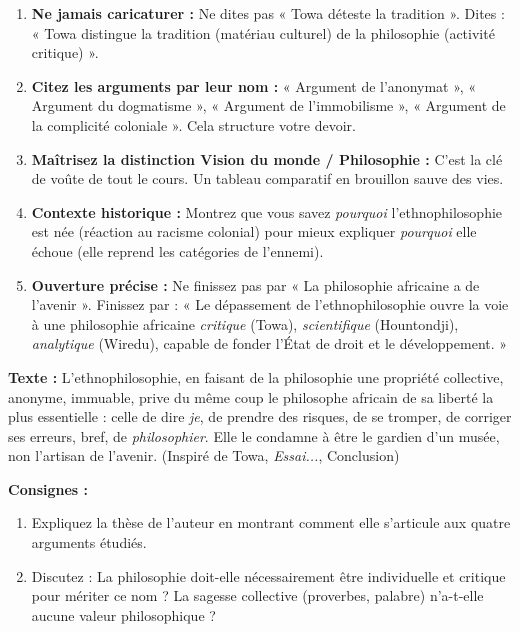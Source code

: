 \documentclass[11pt]{article}
\begin{document}
\begin{methode}
\begin{enumerate}
    \item \textbf{Ne jamais caricaturer :} Ne dites pas « Towa déteste la tradition ». Dites : « Towa distingue la tradition (matériau culturel) de la philosophie (activité critique) ».
    \item \textbf{Citez les arguments par leur nom :} « Argument de l'anonymat », « Argument du dogmatisme », « Argument de l'immobilisme », « Argument de la complicité coloniale ». Cela structure votre devoir.
    \item \textbf{Maîtrisez la distinction Vision du monde / Philosophie :} C'est la clé de voûte de tout le cours. Un tableau comparatif en brouillon sauve des vies.
    \item \textbf{Contexte historique :} Montrez que vous savez \emph{pourquoi} l'ethnophilosophie est née (réaction au racisme colonial) pour mieux expliquer \emph{pourquoi} elle échoue (elle reprend les catégories de l'ennemi).
    \item \textbf{Ouverture précise :} Ne finissez pas par « La philosophie africaine a de l'avenir ». Finissez par : « Le dépassement de l'ethnophilosophie ouvre la voie à une philosophie africaine \emph{critique} (Towa), \emph{scientifique} (Hountondji), \emph{analytique} (Wiredu), capable de fonder l'État de droit et le développement. »
\end{enumerate}
\end{methode}

\begin{exercice}
\textbf{Texte :} \guillemotleft L'ethnophilosophie, en faisant de la philosophie une propriété collective, anonyme, immuable, prive du même coup le philosophe africain de sa liberté la plus essentielle : celle de dire \emph{je}, de prendre des risques, de se tromper, de corriger ses erreurs, bref, de \emph{philosophier}. Elle le condamne à être le gardien d'un musée, non l'artisan de l'avenir. \guillemotright (Inspiré de Towa, \emph{Essai...}, Conclusion)

\textbf{Consignes :}
\begin{enumerate}
    \item Expliquez la thèse de l'auteur en montrant comment elle s'articule aux quatre arguments étudiés.
    \item Discutez : La philosophie doit-elle nécessairement être individuelle et critique pour mériter ce nom ? La sagesse collective (proverbes, palabre) n'a-t-elle aucune valeur philosophique ?
\end{enumerate}
\end{exercice}
\end{document}
